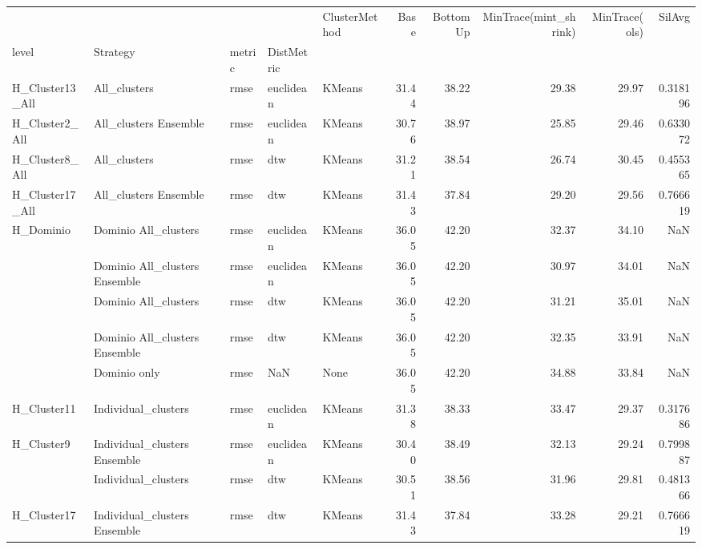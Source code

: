 \begin{tabular}{lllllrrrrr}
\toprule
            &                              &      &     & ClusterMethod &   Base &  BottomUp &  MinTrace(mint\_shrink) &  MinTrace(ols) &    SilAvg \\
level & Strategy & metric & DistMetric &               &        &           &                        &                &           \\
\midrule
H\_Cluster13\_All & All\_clusters & rmse & euclidean &        KMeans &  31.44 &     38.22 &                  29.38 &          29.97 &  0.318196 \\
H\_Cluster2\_All & All\_clusters Ensemble & rmse & euclidean &        KMeans &  30.76 &     38.97 &                  25.85 &          29.46 &  0.633072 \\
H\_Cluster8\_All & All\_clusters & rmse & dtw &        KMeans &  31.21 &     38.54 &                  26.74 &          30.45 &  0.455365 \\
H\_Cluster17\_All & All\_clusters Ensemble & rmse & dtw &        KMeans &  31.43 &     37.84 &                  29.20 &          29.56 &  0.766619 \\
H\_Dominio & Dominio All\_clusters & rmse & euclidean &        KMeans &  36.05 &     42.20 &                  32.37 &          34.10 &       NaN \\
            & Dominio All\_clusters Ensemble & rmse & euclidean &        KMeans &  36.05 &     42.20 &                  30.97 &          34.01 &       NaN \\
            & Dominio All\_clusters & rmse & dtw &        KMeans &  36.05 &     42.20 &                  31.21 &          35.01 &       NaN \\
            & Dominio All\_clusters Ensemble & rmse & dtw &        KMeans &  36.05 &     42.20 &                  32.35 &          33.91 &       NaN \\
            & Dominio only & rmse & NaN &          None &  36.05 &     42.20 &                  34.88 &          33.84 &       NaN \\
H\_Cluster11 & Individual\_clusters & rmse & euclidean &        KMeans &  31.38 &     38.33 &                  33.47 &          29.37 &  0.317686 \\
H\_Cluster9 & Individual\_clusters Ensemble & rmse & euclidean &        KMeans &  30.40 &     38.49 &                  32.13 &          29.24 &  0.799887 \\
            & Individual\_clusters & rmse & dtw &        KMeans &  30.51 &     38.56 &                  31.96 &          29.81 &  0.481366 \\
H\_Cluster17 & Individual\_clusters Ensemble & rmse & dtw &        KMeans &  31.43 &     37.84 &                  33.28 &          29.21 &  0.766619 \\
\bottomrule
\end{tabular}
